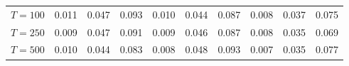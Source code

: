 % 
\begin{tabular}{cccccccccc}
  \hline
  \hline
$T = 100$ & 0.011 & 0.047 & 0.093 & 0.010 & 0.044 & 0.087 & 0.008 & 0.037 & 0.075 \\ 
  $T = 250$ & 0.009 & 0.047 & 0.091 & 0.009 & 0.046 & 0.087 & 0.008 & 0.035 & 0.069 \\ 
  $T = 500$ & 0.010 & 0.044 & 0.083 & 0.008 & 0.048 & 0.093 & 0.007 & 0.035 & 0.077 \\ 
   \hline
\end{tabular}
